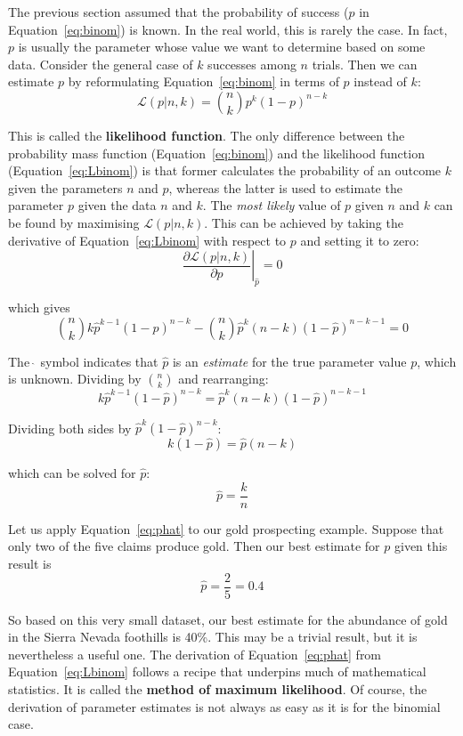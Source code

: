 The previous section assumed that the probability of success ($p$ in
Equation~\ref{eq:binom}) is known.  In the real world, this is rarely
the case. In fact, $p$ is usually the parameter whose value we want to
determine based on some data. Consider the general case of $k$
successes among $n$ trials. Then we can estimate $p$ by reformulating
Equation~\ref{eq:binom} in terms of $p$ instead of $k$:
\begin{equation}
  \mathcal{L}(p|n,k) = \binom{n}{k} p^k (1-p)^{n-k}
  \label{eq:Lbinom}
\end{equation}

This is called the \textbf{likelihood function}. The only difference
between the probability mass function (Equation~\ref{eq:binom}) and
the likelihood function (Equation~\ref{eq:Lbinom}) is that former
calculates the probability of an outcome $k$ given the parameters $n$
and $p$, whereas the latter is used to estimate the parameter $p$
given the data $n$ and $k$. The \emph{most likely} value of $p$ given
$n$ and $k$ can be found by maximising $\mathcal{L}(p|n,k)$.  This can
be achieved by taking the derivative of Equation~\ref{eq:Lbinom} with
respect to $p$ and setting it to zero:
\[
\left.\frac{\partial{\mathcal{L}(p|n,k)}}{\partial{p}}\right|_{\hat{p}} = 0
\]

\noindent which gives
\[
\binom{n}{k} k \hat{p}^{k-1} (1-\hat{p})^{n-k} -
\binom{n}{k} \hat{p}^k (n-k) (1-\hat{p})^{n-k-1} = 0
\]

The $\hat{~}$ symbol indicates that $\hat{p}$ is an \emph{estimate}
for the true parameter value $p$, which is unknown. Dividing by
$\binom{n}{k}$ and rearranging:
\[
  k \hat{p}^{k-1} (1-\hat{p})^{n-k} = \hat{p}^k (n-k) (1-\hat{p})^{n-k-1}
\]

Dividing both sides by $\hat{p}^k (1-\hat{p})^{n-k}$:
\[
k (1-\hat{p}) = \hat{p} (n-k)
\]

\noindent which can be solved for $\hat{p}$:
\begin{equation}
  \hat{p} = \frac{k}{n}
  \label{eq:phat}
\end{equation}

Let us apply Equation~\ref{eq:phat} to our gold prospecting example.
Suppose that only two of the five claims produce gold. Then our best
estimate for $p$ given this result is
\[
\hat{p} = \frac{2}{5} = 0.4
\]

So based on this very small dataset, our best estimate for the
abundance of gold in the Sierra Nevada foothills is 40\%. This may be
a trivial result, but it is nevertheless a useful one. The derivation
of Equation~\ref{eq:phat} from Equation~\ref{eq:Lbinom} follows a
recipe that underpins much of mathematical statistics. It is called
the \textbf{method of maximum likelihood}. Of course, the derivation
of parameter estimates is not always as easy as it is for the binomial
case.

